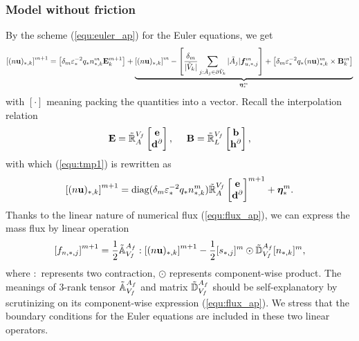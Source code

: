 \documentclass{report}
\begin{document}
\subsubsection{Model without friction}
By the scheme (\ref{equ:euler_ap}) for the Euler equations, we get 
\begin{equation} \label{equ:tmp1}
    \left[(n\mathbf{u})_{*,k}\right]^{m+1} = \left[\delta_m \varepsilon^{-2}_* q_* n^m_{*,k}\mathbf{E}^{m+1}_k \right] + \underbrace{\left[(n\mathbf{u})_{*,k}\right]^{m} - \left[\frac{\delta_m}{|{\Tilde{V}}_k|}\sum_{j:\Tilde{A}_j\in\partial\Tilde{V}_k}|\Tilde{A}_j|\bm{f}^m_{u,*,j}\right] + \left[\delta_m \varepsilon^{-2}_* q_*(n\mathbf{u})^m_{*,k} \times \mathbf{B}^m_{k}\right]}_{\bm{\eta}^m_*}
\end{equation}
with $[\cdot]$ meaning packing the quantities into a vector. Recall the interpolation relation
\begin{equation*}
    \mathbf{E} = \Tilde{\mathbb{R}}^{V_f}_{A}
    \begin{bmatrix}
    \mathbf{e} \\
    \mathbf{d}^\partial 
    \end{bmatrix},
    \ \ \ \ 
    \mathbf{B} = \Tilde{\mathbb{R}}^{V_f}_{L}
    \begin{bmatrix}
    \mathbf{b} \\
    \mathbf{h}^\partial 
    \end{bmatrix},
\end{equation*}
with which (\ref{equ:tmp1}) is rewritten as
\begin{equation} \label{equ:tmp2}
    \left[(n\mathbf{u})_{*,k}\right]^{m+1} = \text{diag}(\delta_m \varepsilon^{-2}_* q_* n^m_{*,k}) \Tilde{\mathbb{R}}^{V_f}_{A} 
    \begin{bmatrix}
    \mathbf{e} \\
    \mathbf{d}^\partial 
    \end{bmatrix}^{m+1} + \bm{\eta}^m_*.
\end{equation}
Thanks to the linear nature of numerical flux (\ref{equ:flux_ap}), we can express the mass flux by linear operation 
\begin{equation} \label{equ:tmp3}
    \left[f_{n,*,j}\right]^{m+1} = \frac{1}{2} \Tilde{\mathbb{A}}_{V_f}^{A_f} :  \left[(n\mathbf{u})_{*,k}\right]^{m+1} - \frac{1}{2} [s_{*,j}]^m \odot \Tilde{\mathbb{D}}_{V_f}^{A_f} [n_{*,k}]^m,
\end{equation}
where $:$ represents two contraction, $\odot$ represents component-wise product. The meanings of 3-rank tensor $\Tilde{\mathbb{A}}_{V_f}^{A_f}$ and matrix $\Tilde{\mathbb{D}}_{V_f}^{A_f}$ should be self-explanatory by scrutinizing on its component-wise expression (\ref{equ:flux_ap}). We stress that the boundary conditions for the Euler equations are included in these two linear operators. 
\end{document}
